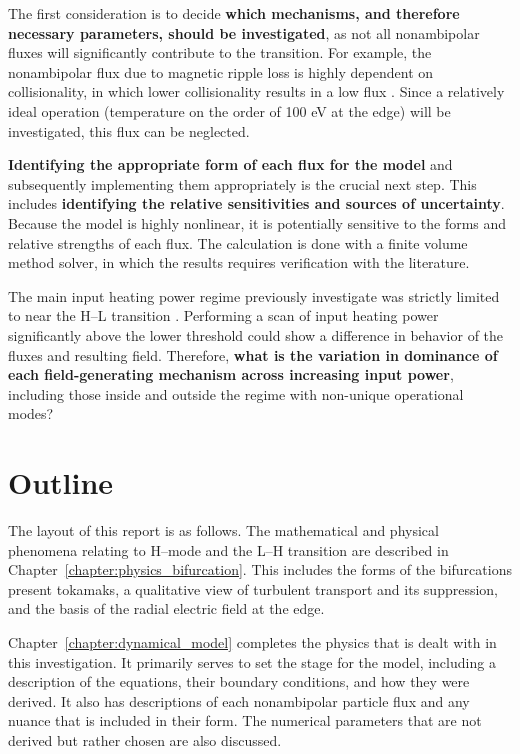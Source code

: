 The first consideration is to decide \textbf{which mechanisms, and therefore necessary parameters, should be investigated}, as not all nonambipolar fluxes will significantly contribute to the transition.
For example, the nonambipolar flux due to magnetic ripple loss is highly dependent on collisionality, in which lower collisionality results in a low flux \cite{stringer_effect_1972}.
Since a relatively ideal operation (temperature on the order of 100 eV at the edge) will be investigated, this flux can be neglected.

\textbf{Identifying the appropriate form of each flux for the model} and subsequently implementing them appropriately is the crucial next step.
This includes \textbf{identifying the relative sensitivities and sources of uncertainty}.
Because the model is highly nonlinear, it is potentially sensitive to the forms and relative strengths of each flux.
The calculation is done with a finite volume method solver, in which the results requires verification with the literature.

The main input heating power regime previously investigate was strictly limited to near the H--L transition \cite{staps_backstepping_2017}.
Performing a scan of input heating power significantly above the lower threshold could show a difference in behavior of the fluxes and resulting field.
Therefore, \textbf{what is the variation in dominance of each field-generating mechanism across increasing input power}, including those inside and outside the regime with non-unique operational modes?

\section{Outline}\label{sec:outline}
The layout of this report is as follows.
The mathematical and physical phenomena relating to H--mode and the L--H transition are described in Chapter~\ref{chapter:physics_bifurcation}.
This includes the forms of the bifurcations present tokamaks, a qualitative view of turbulent transport and its suppression, and the basis of the radial electric field at the edge.

Chapter~\ref{chapter:dynamical_model} completes the physics that is dealt with in this investigation.
It primarily serves to set the stage for the model, including a description of the equations, their boundary conditions, and how they were derived.
It also has descriptions of each nonambipolar particle flux and any nuance that is included in their form.
The numerical parameters that are not derived but rather chosen are also discussed.

